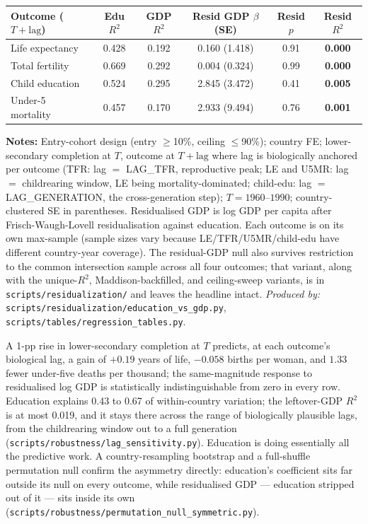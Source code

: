 \documentclass[12pt,letterpaper]{article}
\begin{document}
{\footnotesize\setlength{\tabcolsep}{3pt}
\begin{longtable}[]{@{}lccccc@{}}
\toprule
Outcome ($T{+}\text{lag}$) & Edu $R^2$ & GDP $R^2$ & Resid GDP $\beta$ (SE) & Resid $p$ & Resid $R^2$ \\
\midrule
\endhead
Life expectancy   & 0.428 & 0.192 & \hphantom{$-$}0.160 (1.418) & 0.91 & \textbf{0.000} \\
Total fertility   & 0.669 & 0.292 & \hphantom{$-$}0.004 (0.324) & 0.99 & \textbf{0.000} \\
Child education   & 0.524 & 0.295 & \hphantom{$-$}2.845 (3.472) & 0.41 & \textbf{0.005} \\
Under-5 mortality & 0.457 & 0.170 & 2.933 (9.494)  & 0.76 & \textbf{0.001} \\
\bottomrule
\end{longtable}}\addtocounter{table}{-1}%

\begin{minipage}{\dimexpr\textwidth-2em}
\scriptsize
\textbf{Notes:} Entry-cohort design (entry $\geq$10\%, ceiling
$\leq$90\%); country FE; lower-secondary completion at $T$, outcome
at $T{+}\text{lag}$ where lag is biologically anchored per outcome
(TFR: lag $=$ LAG\_TFR, reproductive peak; LE and U5MR: lag $=$
childrearing window, LE being mortality-dominated; child-edu: lag
$=$ LAG\_GENERATION, the cross-generation step);
$T=1960$--$1990$;
country-clustered SE in parentheses. Residualised GDP is log GDP per
capita after Frisch-Waugh-Lovell residualisation against education.
Each outcome is on its own max-sample (sample sizes vary because
LE/TFR/U5MR/child-edu have different country-year coverage). The
residual-GDP null also survives restriction to the common intersection
sample across all four outcomes; that variant, along with the
unique-$R^2$, Maddison-backfilled, and ceiling-sweep variants, is in
\texttt{scripts/residualization/} and leaves the headline intact.
\textit{Produced by:} \texttt{scripts/residualization/education\_vs\_gdp.py},
\texttt{scripts/tables/regression\_tables.py}.
\end{minipage}

A 1-pp rise in lower-secondary completion at $T$ predicts, at each
outcome's biological lag, a gain of $+0.19$ years of life, $-0.058$
births per woman, and $1.33$ fewer under-five deaths per thousand; the
same-magnitude response to residualised log GDP is statistically
indistinguishable from zero in every row. Education explains 0.43 to
0.67 of within-country variation; the leftover-GDP $R^2$ is at most
0.019, and it stays there across the range of biologically plausible
lags, from the childrearing window out to a full generation
(\texttt{scripts/robustness/lag\_sensitivity.py}). Education
is doing essentially all the predictive work.
A country-resampling bootstrap and a full-shuffle permutation null
confirm the asymmetry directly: education's coefficient sits far outside
its null on every outcome, while residualised GDP --- education stripped
out of it --- sits inside its own
(\nolinkurl{scripts/robustness/permutation_null_symmetric.py}).
\end{document}
